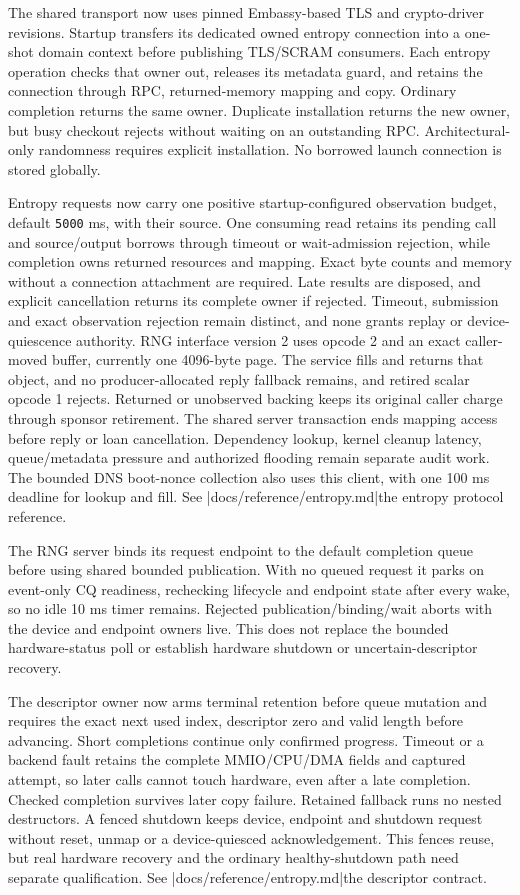 The shared transport now uses pinned Embassy-based TLS and crypto-driver
revisions. Startup transfers its dedicated owned entropy connection into a
one-shot domain context before publishing TLS/SCRAM consumers. Each entropy
operation checks that owner out, releases its metadata guard, and retains the
connection through RPC, returned-memory mapping and copy. Ordinary completion
returns the same owner. Duplicate installation returns the new owner, but busy
checkout rejects without waiting on an outstanding RPC. Architectural-only
randomness requires explicit installation. No borrowed launch connection is
stored globally.

Entropy requests now carry one positive startup-configured observation budget,
default \texttt{5000} ms, with their source. One consuming read retains its
pending call and source/output borrows through timeout or wait-admission rejection, while
completion owns returned resources and mapping. Exact byte counts and memory
without a connection attachment are required. Late results are disposed, and
explicit cancellation returns its complete owner if rejected. Timeout,
submission and exact observation rejection remain distinct, and none grants replay
or device-quiescence authority. RNG interface version 2 uses opcode 2 and an
exact caller-moved buffer, currently one 4096-byte page. The service fills and
returns that object, and no producer-allocated reply fallback remains, and retired
scalar opcode 1 rejects. Returned or unobserved backing keeps its original
caller charge through sponsor retirement. The shared server transaction ends
mapping access before reply or loan cancellation. Dependency lookup, kernel
cleanup latency, queue/metadata pressure and authorized flooding remain separate
audit work. The bounded DNS boot-nonce collection also uses this client, with
one 100 ms deadline for lookup and fill. See
\repofiletext|docs/reference/entropy.md|{the entropy protocol reference}.

The RNG server binds its request endpoint to the default completion queue before
using shared bounded publication. With no queued request it parks on event-only
CQ readiness, rechecking lifecycle and endpoint state after every wake, so no idle
10 ms timer remains. Rejected publication/binding/wait aborts with the device
and endpoint owners live. This does not replace the bounded hardware-status poll
or establish hardware shutdown or uncertain-descriptor recovery.

The descriptor owner now arms terminal retention before queue mutation and
requires the exact next used index, descriptor zero and valid length before
advancing. Short completions continue only confirmed progress. Timeout or a
backend fault retains the complete MMIO/CPU/DMA fields and captured attempt, so
later calls cannot touch hardware, even after a late completion. Checked
completion survives later copy failure. Retained fallback runs no nested
destructors. A fenced shutdown keeps device, endpoint and shutdown request
without reset, unmap or a device-quiesced acknowledgement. This fences reuse, but
real hardware recovery and the ordinary healthy-shutdown path need separate
qualification. See \repofiletext|docs/reference/entropy.md|{the descriptor contract}.

